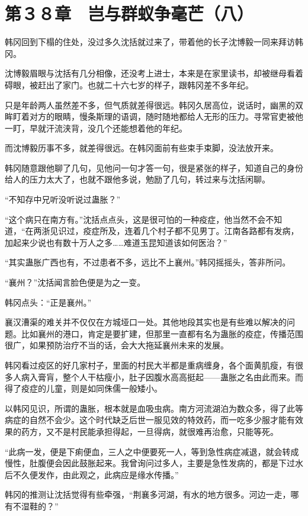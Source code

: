 \section{第３８章　岂与群蚁争毫芒（八）}

韩冈回到下榻的住处，没过多久沈括就过来了，带着他的长子沈博毅一同来拜访韩冈。

沈博毅眉眼与沈括有几分相像，还没考上进士，本来是在家里读书，却被继母看着碍眼，被赶出了家门。也就二十六七岁的样子，跟韩冈差不多年纪。

只是年龄两人虽然差不多，但气质就差得很远。韩冈久居高位，说话时，幽黑的双眸盯着对方的眼睛，慢条斯理的语调，随时随地都给人无形的压力。寻常官吏被他一盯，早就汗流浃背，没几个还能想着他的年纪。

而沈博毅历事不多，就差得很远。在韩冈面前有些束手束脚，没法放开来。

韩冈随意跟他聊了几句，见他问一句才答一句，很是紧张的样子，知道自己的身份给人的压力太大了，也就不跟他多说，勉励了几句，转过来与沈括闲聊。

“不知存中兄听没听说过蛊胀？”

“这个病只在南方有。”沈括点点头，这是很可怕的一种疫症，他当然不会不知道，“在两浙见识过，疫症所及，连着几个村子都不见男丁。江南各路都有发病，加起来少说也有数十万人之多……难道玉昆知道该如何医治？”

“其实蛊胀广西也有，不过患者不多，远比不上襄州。”韩冈摇摇头，答非所问。

“襄州？”沈括闻言脸色便是为之一变。

韩冈点头：“正是襄州。”

襄汉漕渠的难关并不仅仅在方城垭口一处。其他地段其实也是有些难以解决的问题。比如襄州的港口，肯定是要扩建，但那里一直都有名为蛊胀的疫症，传播范围很广，如果预防治疗不当的话，会大大拖延襄州未来的发展。

韩冈看过疫区的好几家村子，里面的村民大半都是重病缠身，各个面黄肌瘦，有很多人病入膏肓，整个人干枯瘦小，肚子因腹水高高挺起——蛊胀之名由此而来。而得了疫症的儿童，则是如同侏儒一般矮小。

以韩冈见识，所谓的蛊胀，根本就是血吸虫病。南方河流湖泊为数众多，得了此等病症的自然不会少。这个时代缺乏后世一服见效的特效药，而一吃多少服才能有效果的药方，又不是村民能承担得起，一旦得病，就很难再治愈，只能等死。

“此病一发，便是下痢便血，三人之中便要死一人，等到急性病症减退，就会转成慢性，肚腹便会因此鼓胀起来。我曾询问过多人，主要是急性发病的，都是下过水后不久便发作，由此观之，此病应是缘水传播。”

韩冈的推测让沈括觉得有些牵强，“荆襄多河湖，有水的地方很多。河边一走，哪有不湿鞋的？”

